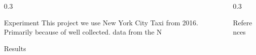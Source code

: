 \documentclass{msuposter}
\newcommand{\colwidth}{0.3\linewidth}
\begin{document}
\begin{frame}{}
\begin{columns}[t]
\begin{column}{\colwidth}
\begin{block}{Experiment}
This project we use New York City Taxi from 2016. Primarily because of well collected. data from the N 

\cite{nyc2016}

\end{block}

\begin{block}{Results}

\end{block}


\end{column}


\begin{column}{\colwidth}


\begin{block}{References}
\scriptsize


\end{block}

\end{column}

\end{columns}
	\end{frame}
\end{document}
